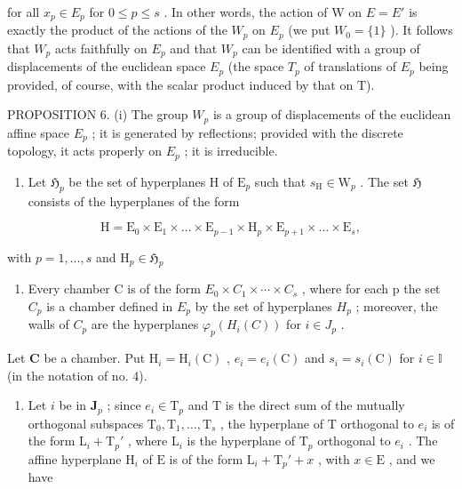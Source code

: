for all \(x_{p} \in E_{p}\) for \(0 \leqslant p \leqslant s\) . In other words, the action of W on \(E = E'\) is exactly the product of the actions of the \(W_{p}\) on \(E_{p}\) (we put \(W_{0} = \{1\}\) ). It follows that \(W_{p}\) acts faithfully on \(E_{p}\) and that \(W_{p}\) can be identified with a group of displacements of the euclidean space \(E_{p}\) (the space \(T_{p}\) of translations of \(E_{p}\) being provided, of course, with the scalar product induced by that on T).

PROPOSITION 6. (i) The group \(W_{p}\) is a group of displacements of the euclidean affine space \(E_{p}\) ; it is generated by reflections; provided with the discrete topology, it acts properly on \(E_{p}\) ; it is irreducible.

\begin{enumerate}
\def\labelenumi{(\roman{enumi})}
\setcounter{enumi}{1}
\tightlist
\item
  Let \(\mathfrak{H}_p\) be the set of hyperplanes \(\mathrm{H}\) of \(\mathrm{E}_p\) such that \(s_{\mathrm{H}} \in \mathrm{W}_p\) . The set \(\mathfrak{H}\) consists of the hyperplanes of the form
\end{enumerate}

\[
\mathrm{H} = \mathrm{E} _ {0} \times \mathrm{E} _ {1} \times \dots \times \mathrm{E} _ {p - 1} \times \mathrm{H} _ {p} \times \mathrm{E} _ {p + 1} \times \dots \times \mathrm{E} _ {s},
\]

with \(p = 1,\dots ,s\) and \(\mathrm{H}_p\in \mathfrak{H}_p\)

\begin{enumerate}
\def\labelenumi{(\roman{enumi})}
\setcounter{enumi}{2}
\tightlist
\item
  Every chamber C is of the form \(E_{0} \times C_{1} \times \cdots \times C_{s}\) , where for each p the set \(C_{p}\) is a chamber defined in \(E_{p}\) by the set of hyperplanes \(H_{p}\) ; moreover, the walls of \(C_{p}\) are the hyperplanes \(\varphi_{p}(H_{i}(C))\) for \(i \in J_{p}\) .
\end{enumerate}

Let \(\mathbf{C}\) be a chamber. Put \(\mathrm{H}_i = \mathrm{H}_i(\mathrm{C})\) , \(e_i = e_i(\mathrm{C})\) and \(s_i = s_i(\mathrm{C})\) for \(i \in \mathbb{I}\) (in the notation of no. 4).

\begin{enumerate}
\def\labelenumi{(\roman{enumi})}
\tightlist
\item
  Let \(i\) be in \(\mathbf{J}_p\) ; since \(e_i \in \mathrm{T}_p\) and \(\mathrm{T}\) is the direct sum of the mutually orthogonal subspaces \(\mathrm{T}_0, \mathrm{T}_1, \ldots, \mathrm{T}_s\) , the hyperplane of \(\mathrm{T}\) orthogonal to \(e_i\) is of the form \(\mathrm{L}_i + \mathrm{T}_p'\) , where \(\mathrm{L}_i\) is the hyperplane of \(\mathrm{T}_p\) orthogonal to \(e_i\) . The affine hyperplane \(\mathrm{H}_i\) of \(\mathrm{E}\) is of the form \(\mathrm{L}_i + \mathrm{T}_p' + x\) , with \(x \in \mathrm{E}\) , and we have
\end{enumerate}

